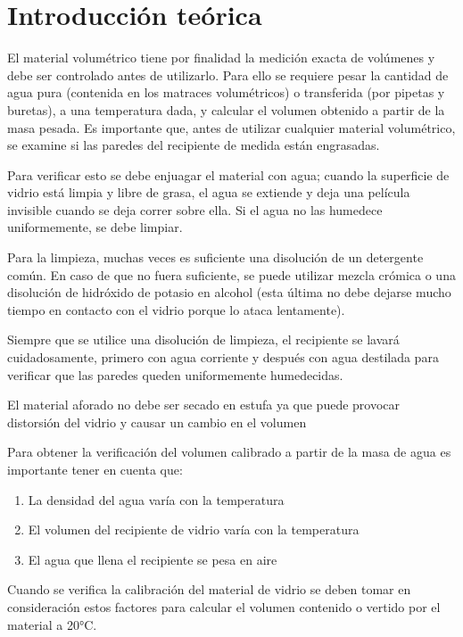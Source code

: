 
\section{Introducción teórica}

El material volumétrico tiene por finalidad la medición exacta de volúmenes y debe ser controlado antes de utilizarlo. Para ello se requiere pesar la cantidad de agua pura (contenida en los matraces volumétricos) o transferida (por pipetas y buretas), a una temperatura dada, y calcular el volumen obtenido a partir de la masa pesada. Es importante que, antes de utilizar cualquier material volumétrico, se examine si las paredes del recipiente de medida están engrasadas. 

Para verificar esto se debe enjuagar el material con agua; cuando la superficie de vidrio está limpia y libre de grasa, el agua se extiende y deja una película invisible cuando se deja correr sobre ella. Si el agua no las humedece uniformemente, se debe limpiar.

Para la limpieza, muchas veces es suficiente una disolución de un detergente común. En caso de que no fuera suficiente, se puede utilizar mezcla crómica o una disolución de hidróxido de potasio en alcohol (esta última no debe dejarse mucho tiempo en contacto con el vidrio porque lo ataca lentamente). 

Siempre que se utilice una disolución de limpieza, el recipiente se lavará cuidadosamente, primero con agua corriente y después con agua destilada para verificar que las paredes queden uniformemente humedecidas. 

El material aforado no debe ser secado en estufa ya que puede provocar distorsión del vidrio y causar un cambio en el volumen

Para obtener la verificación del volumen calibrado a partir de la masa de agua es importante tener en cuenta que: 

\begin{enumerate}
    \item La densidad del agua varía con la temperatura 
    \item El volumen del recipiente de vidrio varía con la temperatura 
    \item El agua que llena el recipiente se pesa en aire 
\end{enumerate}

Cuando se verifica la calibración del material de vidrio se deben tomar en consideración estos factores para calcular el volumen contenido o vertido por el material a 20°C. 

